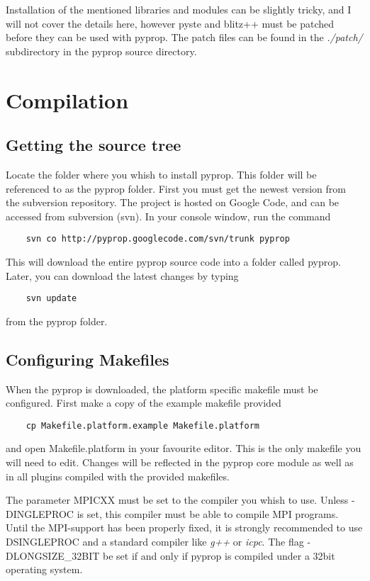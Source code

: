 Installation of the mentioned libraries and modules can be slightly tricky, and I will not cover the details here, 
however pyste and blitz++ must be patched before they can be used with pyprop. The patch files can be found in 
the \textit{./patch/} subdirectory in the pyprop source directory.

\section{Compilation}
\subsection*{Getting the source tree}
Locate the folder where you whish to install pyprop. This folder will be referenced to as the pyprop folder.
First you must get the newest version from the subversion repository. The project is hosted on Google Code, and 
can be accessed from subversion (svn). In your console window, run the command
\begin{verbatim}
	svn co http://pyprop.googlecode.com/svn/trunk pyprop
\end{verbatim}
This will download the entire pyprop source code into a folder called pyprop. Later, you can download the latest
changes by typing
\begin{verbatim}
	svn update
\end{verbatim}
from the pyprop folder.


\subsection*{Configuring Makefiles}
When the pyprop is downloaded, the platform specific makefile must be configured. First make
a copy of the example makefile provided
\begin{verbatim}
	cp Makefile.platform.example Makefile.platform
\end{verbatim}
and open Makefile.platform in your favourite editor. This is the only makefile you will need to edit. 
Changes will be reflected in the pyprop core module as well as in all plugins compiled with the provided
makefiles.

The parameter MPICXX must be set to the compiler you whish to use. Unless -DINGLEPROC is set, this compiler
must be able to compile MPI programs. Until the MPI-support has been properly fixed, it is strongly recommended
to use \-DSINGLEPROC and a standard compiler like \textit{g++} or \textit{icpc}.
The flag -DLONGSIZE\_32BIT be set if and only if pyprop is compiled under a 32bit operating system.

